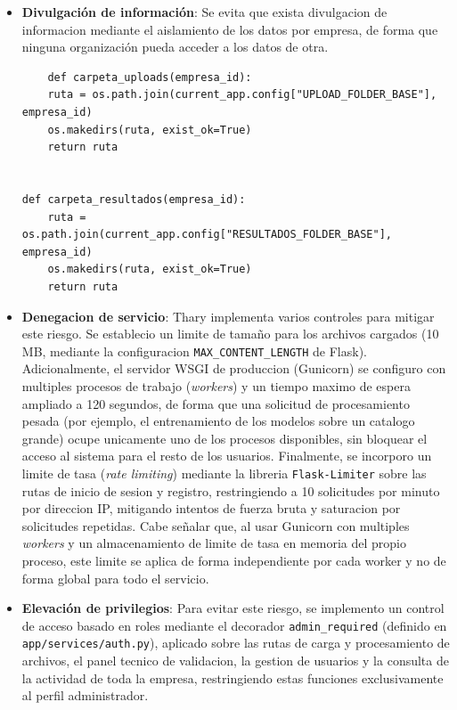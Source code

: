 \begin{itemize}
    \begin{verbatim}
    def pedido_confirmar():
        if confirmados_ahora:
            lista = ", ".join(seleccionados[:5]) + ("…" if len(seleccionados) > 5 else "")
            registrar_actividad(
                session["empresa_id"], session.get("username"), usuario,
                "pedido_confirmado", f"Confirmó {confirmados_ahora} pedido(s): {lista}",
            )
    \end{verbatim}

    \item \textbf{Divulgación de información}: Se evita que exista divulgacion de informacion mediante el aislamiento de los datos por empresa, de forma que ninguna organización pueda acceder a los datos de otra.
    
    \begin{verbatim}
    def carpeta_uploads(empresa_id):
    ruta = os.path.join(current_app.config["UPLOAD_FOLDER_BASE"], empresa_id)
    os.makedirs(ruta, exist_ok=True)
    return ruta


def carpeta_resultados(empresa_id):
    ruta = os.path.join(current_app.config["RESULTADOS_FOLDER_BASE"], empresa_id)
    os.makedirs(ruta, exist_ok=True)
    return ruta
    \end{verbatim}

    \item \textbf{Denegacion de servicio}: Thary implementa varios controles para mitigar este riesgo. Se establecio un limite de tamaño para los archivos cargados (10 MB, mediante la configuracion \texttt{MAX\_CONTENT\_LENGTH} de Flask). Adicionalmente, el servidor WSGI de produccion (Gunicorn) se configuro con multiples procesos de trabajo (\textit{workers}) y un tiempo maximo de espera ampliado a 120 segundos, de forma que una solicitud de procesamiento pesada (por ejemplo, el entrenamiento de los modelos sobre un catalogo grande) ocupe unicamente uno de los procesos disponibles, sin bloquear el acceso al sistema para el resto de los usuarios. Finalmente, se incorporo un limite de tasa (\textit{rate limiting}) mediante la libreria \texttt{Flask-Limiter} sobre las rutas de inicio de sesion y registro, restringiendo a 10 solicitudes por minuto por direccion IP, mitigando intentos de fuerza bruta y saturacion por solicitudes repetidas. Cabe señalar que, al usar Gunicorn con multiples \textit{workers} y un almacenamiento de limite de tasa en memoria del propio proceso, este limite se aplica de forma independiente por cada worker y no de forma global para todo el servicio.

    \item \textbf{Elevación de privilegios}: Para evitar este riesgo, se implemento un control de acceso basado en roles mediante el decorador \texttt{admin\_required} (definido en \texttt{app/services/auth.py}), aplicado sobre las rutas de carga y procesamiento de archivos, el panel tecnico de validacion, la gestion de usuarios y la consulta de la actividad de toda la empresa, restringiendo estas funciones exclusivamente al perfil administrador.
    
\end{itemize}